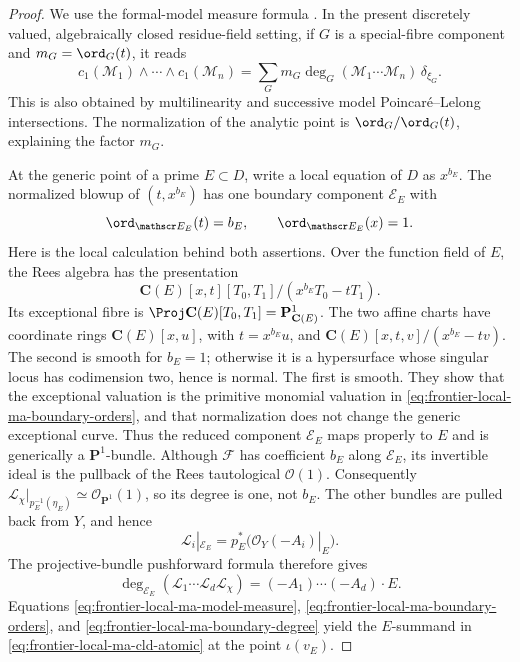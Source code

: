 \begin{proof}
We use the formal-model measure formula
\cite[Theorem~18.5.5 and Proposition~18.5.8]{CLD25}.  In the present
discretely valued, algebraically closed residue-field setting, if \(G\) is a
special-fibre component and
\(m_G=\ord_G(t)\), it reads
\begin{equation}
 c_1(\mathcal M_1)\wedge\cdots\wedge c_1(\mathcal M_n)
 =\sum_Gm_G\deg_G(\mathcal M_1\cdots\mathcal M_n)\,\delta_{\xi_G}.
 \label{eq:frontier-local-ma-model-measure}
\end{equation}
This is also obtained by multilinearity and successive model
Poincar\'e--Lelong intersections.  The normalization of the analytic point is
\(\ord_G/\ord_G(t)\), explaining the factor \(m_G\).

At the generic point of a prime \(E\subset D\), write a local equation of
\(D\) as \(x^{b_E}\).  The normalized blowup of \((t,x^{b_E})\) has one
boundary component \(\mathscr E_E\) with
\begin{equation}
 \ord_{\mathscr E_E}(t)=b_E,
 \qquad
 \ord_{\mathscr E_E}(x)=1.
 \label{eq:frontier-local-ma-boundary-orders}
\end{equation}
Here is the local calculation behind both assertions.  Over the function
field of \(E\), the Rees algebra has the presentation
\[
 \mathbf C(E)[x,t][T_0,T_1]/(x^{b_E}T_0-tT_1).
\]
Its exceptional fibre is
\(\Proj\mathbf C(E)[T_0,T_1]=\mathbf P^1_{\mathbf C(E)}\).
The two affine charts have coordinate rings
\(\mathbf C(E)[x,u]\), with \(t=x^{b_E}u\), and
\(\mathbf C(E)[x,t,v]/(x^{b_E}-tv)\).  The second is smooth for \(b_E=1\);
otherwise it is a hypersurface whose singular locus has codimension two,
hence is normal.  The first is smooth.
They show that the exceptional valuation is the primitive monomial valuation
in \eqref{eq:frontier-local-ma-boundary-orders}, and that normalization does
not change the generic exceptional curve.  Thus the reduced component
\(\mathscr E_E\) maps properly to \(E\) and is generically a
\(\mathbf P^1\)-bundle.  Although
\(\mathscr F\) has coefficient \(b_E\) along \(\mathscr E_E\), its
invertible ideal is the pullback of the Rees tautological
\(\mathcal O(1)\).  Consequently
\(\mathcal L_\chi|_{p_E^{-1}(\eta_E)}\simeq
\mathcal O_{\mathbf P^1}(1)\), so its degree is one, not \(b_E\).  The
other bundles are pulled back from \(Y\), and hence
\begin{equation}
 \mathcal L_i|_{\mathscr E_E}
   =p_E^*\bigl(\mathcal O_Y(-A_i)|_E\bigr).
 \label{eq:frontier-local-ma-boundary-restrictions}
\end{equation}
The projective-bundle pushforward formula therefore gives
\begin{equation}
 \deg_{\mathscr E_E}
       (\mathcal L_1\cdots\mathcal L_d\mathcal L_\chi)
       =(-A_1)\cdots(-A_d)\cdot E.
 \label{eq:frontier-local-ma-boundary-degree}
\end{equation}
Equations \eqref{eq:frontier-local-ma-model-measure},
\eqref{eq:frontier-local-ma-boundary-orders}, and
\eqref{eq:frontier-local-ma-boundary-degree} yield the \(E\)-summand in
\eqref{eq:frontier-local-ma-cld-atomic} at the point
\(\iota(v_E)\).


\end{proof}
